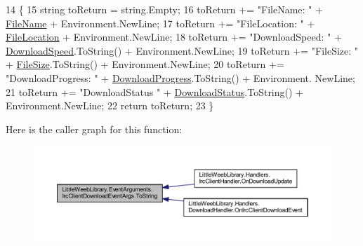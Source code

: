 \begin{DoxyCode}
14         \{
15             \textcolor{keywordtype}{string} toReturn = \textcolor{keywordtype}{string}.Empty;
16             toReturn += \textcolor{stringliteral}{"FileName: "} + \mbox{\hyperlink{class_little_weeb_library_1_1_event_arguments_1_1_irc_client_download_event_args_ae708a4da9c599b02372c55dd08294cd5}{FileName}} + Environment.NewLine;
17             toReturn += \textcolor{stringliteral}{"FileLocation: "} + \mbox{\hyperlink{class_little_weeb_library_1_1_event_arguments_1_1_irc_client_download_event_args_a1f2b2510d2f6c011c709be1610bb0a3a}{FileLocation}} + Environment.NewLine;
18             toReturn += \textcolor{stringliteral}{"DownloadSpeed: "} + \mbox{\hyperlink{class_little_weeb_library_1_1_event_arguments_1_1_irc_client_download_event_args_a0d1c494e39acae88a865520f60d60ea6}{DownloadSpeed}}.ToString() + Environment.NewLine;
19             toReturn += \textcolor{stringliteral}{"FileSize: "} + \mbox{\hyperlink{class_little_weeb_library_1_1_event_arguments_1_1_irc_client_download_event_args_a1d39a926b93644e0d7dd5e0c2e6f6164}{FileSize}}.ToString() + Environment.NewLine;
20             toReturn += \textcolor{stringliteral}{"DownloadProgress: "} + \mbox{\hyperlink{class_little_weeb_library_1_1_event_arguments_1_1_irc_client_download_event_args_aa939c25b51a6fa3ceadd3f22d2f630c4}{DownloadProgress}}.ToString() + Environment.
      NewLine;
21             toReturn += \textcolor{stringliteral}{"DownloadStatus "} + \mbox{\hyperlink{class_little_weeb_library_1_1_event_arguments_1_1_irc_client_download_event_args_a59c5c002bc9b25fea03c12fd0c8a8769}{DownloadStatus}}.ToString() + Environment.NewLine;
22             \textcolor{keywordflow}{return} toReturn;
23         \}
\end{DoxyCode}
Here is the caller graph for this function\+:\nopagebreak
\begin{figure}[H]
\begin{center}
\leavevmode
\includegraphics[width=350pt]{class_little_weeb_library_1_1_event_arguments_1_1_irc_client_download_event_args_a08055fe777a1585dafab7fbeec58b891_icgraph}
\end{center}
\end{figure}


